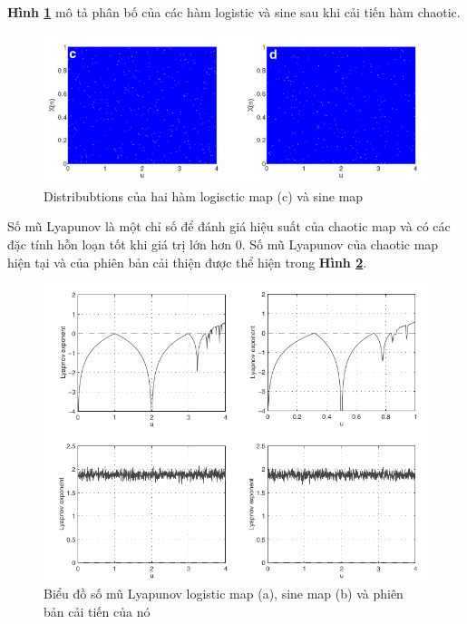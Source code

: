 \textbf{Hình \ref{fig:chap1-improved_map}} mô tả phân bố của các hàm logistic và sine sau khi cải tiến hàm chaotic.

\begin{figure}
    \centering
    \includegraphics[scale=0.7]{graphics/chapter-1/chap1-improved_map.png}
    \caption{Distribubtions của hai hàm logisctic map (c) và sine map}
    \label{fig:chap1-improved_map}
\end{figure}

Số mũ Lyapunov là một chỉ số để đánh giá  hiệu suất của chaotic map và có các đặc tính hỗn loạn tốt khi giá trị lớn hơn 0. Số mũ Lyapunov của chaotic map hiện tại và của phiên bản cải thiện được thể hiện trong \textbf{Hình \ref{fig:chap1-lyapunov}}. 



\begin{figure}
    \centering
    \includegraphics[scale=0.7]{graphics/chapter-1/chap1-lyapunov.png}
    \caption{Biểu đồ số mũ Lyapunov logistic map (a), sine map (b) và phiên bản cải tiến của nó}
    \label{fig:chap1-lyapunov}
\end{figure}

